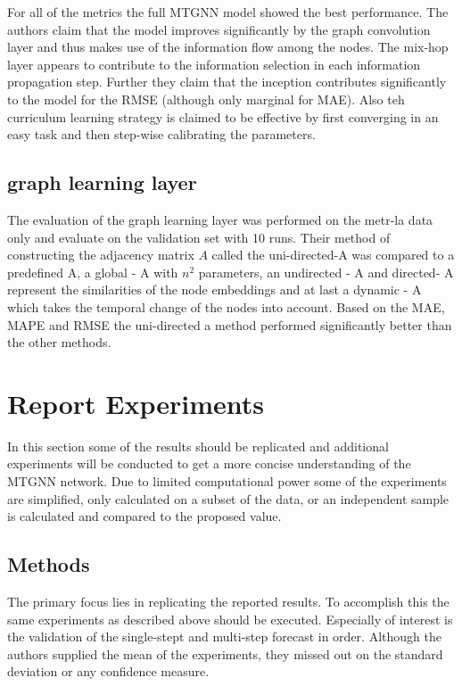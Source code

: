 \documentclass[letterpaper,twocolumn,11pt]{article}
\begin{document}
    For all of the metrics the full MTGNN model showed the best performance.
    The authors claim that the model improves significantly by the graph convolution layer and thus makes use of the information flow among the nodes.
    The mix-hop layer appears to contribute to the information selection in each information propagation step.
    Further they claim that the inception contributes significantly to the model for the RMSE (although only marginal for MAE).
    Also teh curriculum learning strategy is claimed to be effective by first converging in an easy task and then step-wise calibrating the parameters.

    \subsection{graph learning layer}
    The evaluation of the graph learning layer was performed on the metr-la data only and evaluate on the validation set with 10 runs.
    Their method of constructing the adjacency matrix $A$ called the uni-directed-A was compared to a predefined A, a global - A with $n^2$ parameters, an undirected - A and directed- A represent the similarities of the node embeddings and at last a dynamic - A which takes the temporal change of the nodes into account.
    Based on the MAE, MAPE and RMSE the uni-directed a method performed significantly better than the other methods.


    \section{Report Experiments}
    In this section some of the results should be replicated and additional experiments will be conducted to get a more concise understanding of the MTGNN network.
    Due to limited computational power some of the experiments are simplified, only calculated on a subset of the data, or an independent sample is calculated and compared to the proposed value.

    \subsection{Methods}
    The primary focus lies in replicating the reported results.
    To accomplish this the same experiments as described above should be executed.
    Especially of interest is the validation of the single-stept and multi-step forecast in order.
    Although the authors supplied the mean of the experiments, they missed out on the standard deviation or any confidence measure.
\end{document}
